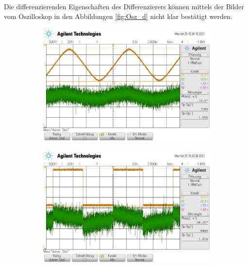 Die differenzierenden Eigenschaften des Differenzierers können mittels der Bilder vom Oszilloskop in den Abbildungen \ref{fig:Osz_d} nicht klar bestätigt werden.
\FloatBarrier
\FloatBarrier
\begin{figure}
  \centering
  \begin{subfigure}{0.35\textwidth}
    \centering
    \includegraphics[width=\textwidth]{ressources/differential_sinus.png}
  \end{subfigure}
  \begin{subfigure}{0.35\textwidth}
    \centering
    \includegraphics[width=\textwidth]{ressources/differential_rechteck.png}
  \end{subfigure}
  \begin{subfigure}{0.35\textwidth}
    \centering

\end{subfigure}
\end{figure}
